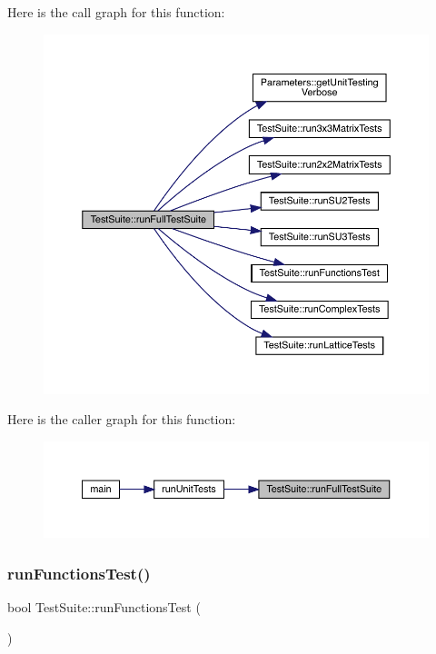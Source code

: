 Here is the call graph for this function\+:
\nopagebreak
\begin{figure}[H]
\begin{center}
\leavevmode
\includegraphics[width=350pt]{class_test_suite_a0fa7e788a1b1c235faa475c0d1aaa1e3_cgraph}
\end{center}
\end{figure}
Here is the caller graph for this function\+:
\nopagebreak
\begin{figure}[H]
\begin{center}
\leavevmode
\includegraphics[width=350pt]{class_test_suite_a0fa7e788a1b1c235faa475c0d1aaa1e3_icgraph}
\end{center}
\end{figure}
\mbox{\label{class_test_suite_af257c555a7fff6934523f80b9c59309c}} 
\subsubsection{\texorpdfstring{runFunctionsTest()}{runFunctionsTest()}}
{\footnotesize\ttfamily bool Test\+Suite\+::run\+Functions\+Test (\begin{DoxyParamCaption}{ }\end{DoxyParamCaption})}

